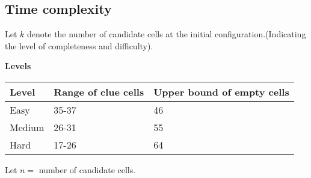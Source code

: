\documentclass[12pt]{article}
\begin{document}
\subsection{Time complexity}
\begin{flushleft}
Let $k$ denote the number of candidate cells at the initial configuration.(Indicating the level of completeness and difficulty).\\


\begin{flushleft}
\textbf{Levels}
\end{flushleft}
{
\centering
\begin{longtable}{| p{3cm} | p{3cm}| p{3cm}| }
\hline
\textbf{Level} & \textbf{ Range of clue cells} & \textbf{Upper bound of empty cells}

	\\ \hline Easy & 35-37 & 46
	\\ \hline Medium & 26-31 & 55
	\\ \hline Hard & 17-26 & 64
	\\ \hline
\end{longtable}
}
Let $n =$ number of candidate cells.\\


\end{flushleft}
\end{document}
